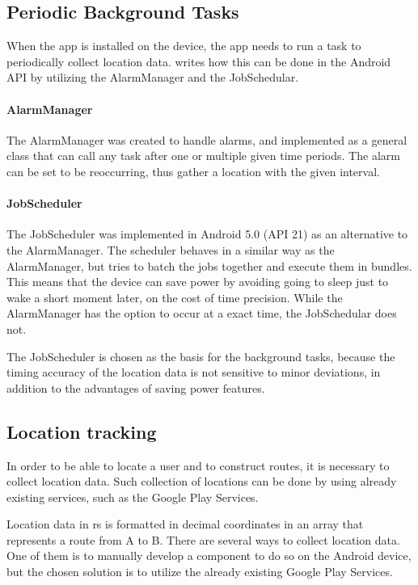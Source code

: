 \subsection{Periodic Background Tasks}\label{ssec:periodictasks}
When the app is installed on the device, the app needs to run a task to periodically collect location data.
 writes how this can be done in the Android API by utilizing the AlarmManager and the JobSchedular.

\paragraph{AlarmManager}
The AlarmManager was created to handle alarms, and implemented as a general class that can call any task after one or multiple given time periods.
The alarm can be set to be reoccurring, thus gather a location with the given interval.

\paragraph{JobScheduler}
The JobScheduler was implemented in Android 5.0 (API 21) as an alternative to the AlarmManager.
The scheduler behaves in a similar way as the AlarmManager, but tries to batch the jobs together and execute them in bundles.
This means that the device can save power by avoiding going to sleep just to wake a short moment later, on the cost of time precision. 
While the AlarmManager has the option to occur at a exact time, the JobSchedular does not.

The JobScheduler is chosen as the basis for the background tasks, because the timing accuracy of the location data is not sensitive to minor deviations, in addition to the advantages of saving power features.

\subsection{Location tracking}\label{ssec:loctrack}
In order to be able to locate a user and to construct routes, it is necessary to collect location data. 
Such collection of locations can be done by using already existing services, such as the Google Play Services.

Location data in \gls{rs} is formatted in decimal coordinates in an array that represents a route from A to B.
There are several ways to collect location data. 
One of them is to manually develop a component to do so on the Android device, but the chosen solution is to utilize the already existing Google Play Services.

